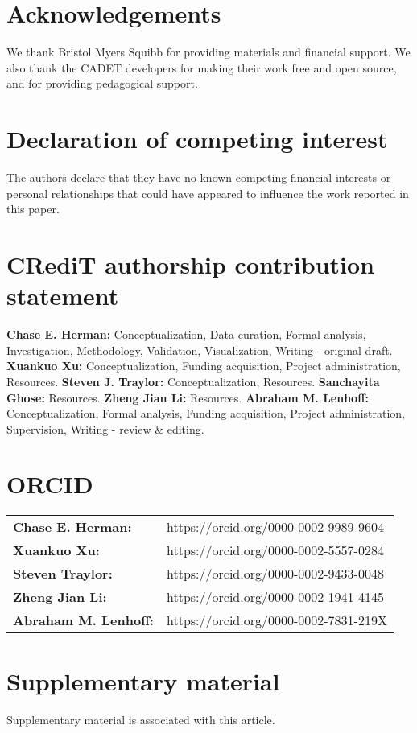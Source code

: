 \documentclass[preprint,review,12pt]{elsarticle}
\begin{document}
\section*{Acknowledgements}
    We thank Bristol Myers Squibb for providing materials and financial support. We also thank the CADET developers for making their work free and open source, and for providing pedagogical support.

\section*{Declaration of competing interest}
    The authors declare that they have no known competing financial interests or personal relationships that could have appeared to influence the work reported in this paper.

\section*{CRediT authorship contribution statement}
    \textbf{Chase E. Herman:} Conceptualization, Data curation, Formal analysis, Investigation, Methodology, Validation, Visualization, Writing - original draft.
    \textbf{Xuankuo Xu:} Conceptualization, Funding acquisition, Project administration, Resources.
    \textbf{Steven J. Traylor:} Conceptualization, Resources.
    \textbf{Sanchayita Ghose:} Resources.
    \textbf{Zheng Jian Li:} Resources.
    \textbf{Abraham M. Lenhoff:} Conceptualization, Formal analysis, Funding acquisition, Project administration, Supervision, Writing - review \& editing.



\section*{ORCID}
    \begin{tabular}{l l}
    \textbf{Chase E. Herman:} & https://orcid.org/0000-0002-9989-9604 \\
    \textbf{Xuankuo Xu:} & https://orcid.org/0000-0002-5557-0284 \\
    \textbf{Steven Traylor:} & https://orcid.org/0000-0002-9433-0048 \\
    \textbf{Zheng Jian Li:} & https://orcid.org/0000-0002-1941-4145 \\
    \textbf{Abraham M. Lenhoff:} & https://orcid.org/0000-0002-7831-219X \\
    \end{tabular}

\section*{Supplementary material}
    Supplementary material is associated with this article.



\end{document}
